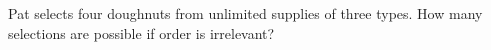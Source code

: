 Pat selects four doughnuts from unlimited supplies of three types. How many selections are possible if order is irrelevant?
